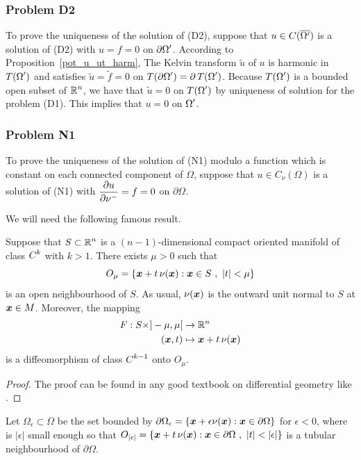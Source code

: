 \subsubsection{Problem D2}
To prove the uniqueness of the solution of (D2), suppose
that $\displaystyle u \in C(\overline{\Omega^{\prime}})$ is a solution
of (D2) with $u = f = 0$ on $\displaystyle \partial \Omega^{\prime}$.
According to Proposition~\ref{pot_u_ut_harm}, The Kelvin transform
$\tilde{u}$ of $u$ is harmonic in $\displaystyle T(\Omega^{\prime})$
and satisfies $\tilde{u} = \tilde{f} = 0$ on
$\displaystyle T(\partial \Omega^{\prime}) = \partial\,T(\Omega^{\prime})$.
Because $\displaystyle T(\Omega^{\prime})$
is a bounded open subset of $\displaystyle \mathbb{R}^n$, we have that
$\tilde{u} = 0$ on $\displaystyle T(\Omega^{\prime})$
by uniqueness of solution for the problem (D1). 
This implies that $u =0$ on $\displaystyle \Omega^{\prime}$.

\subsubsection{Problem N1}
To prove the uniqueness of the solution of (N1) modulo a
function which is constant on each connected component of $\Omega$,
suppose that $u \in C_{\nu}(\Omega)$ is a solution of
(N1) with $\displaystyle \frac{\partial{u}}{\partial \nu^-} = f = 0$ on
$\partial \Omega$.

We will need the following famous result.

\begin{theorem}\label{pot_TBN}
Suppose that $\displaystyle S \subset \mathbb{R}^n$ is a $(n-1)$-dimensional
compact oriented manifold of class $\displaystyle C^k$ with $k>1$.
There exists $\mu >0$ such that
\[
O_\mu = \left\{ {\bm{x}} + t\, \nu({\bm{x}}) : {\bm{x}} \in S \ ,
\ |t|<\mu \right\}
\]
is an open neighbourhood of $S$.  As usual, $\nu({\bm{x}})$ is
the outward unit normal to $S$ at ${\bm{x}} \in M$.  Moreover, the
mapping
\begin{align*}
F: S\times ]-\mu,\mu[ &\rightarrow \mathbb{R}^n \\
({\bm{x}}, t) &\mapsto {\bm{x}} + t\, \nu({\bm{x}})
\end{align*}
is a diffeomorphism of class $\displaystyle C^{k-1}$ onto $O_\mu$.
\end{theorem}

\begin{proof}
The proof can be found in any good textbook on differential geometry
like \cite{Ab,Sp}.
\end{proof}

Let $\Omega_\epsilon \subset \Omega$ be the set bounded by
$\partial \Omega_\epsilon = \{ {\bm{x}} + \epsilon \nu({\bm{x}}) : {\bm{x}}
\in \partial \Omega \}$ for $\epsilon<0$, where is $|\epsilon|$ small
enough so that
$\DS
O_{|\epsilon|} = \left\{ \VEC{x} + t\, \nu(\VEC{x}) : \VEC{x} \in
  \partial \Omega \ , \ |t|<|\epsilon| \right\}$ is a tubular
neighbourhood of $\partial \Omega$.

